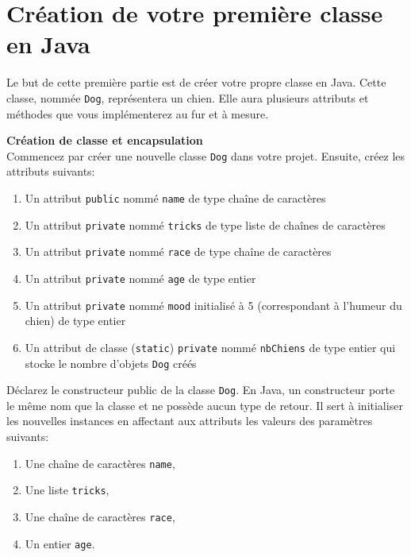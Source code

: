 \section{Création de votre première classe en Java}

Le but de cette première partie est de créer votre propre classe en Java. Cette classe, nommée \lstinline{Dog}, représentera un chien. Elle aura plusieurs attributs et méthodes que vous implémenterez au fur et à mesure.
\\

\begin{Exercice}[10 minutes] \textbf{Création de classe et encapsulation}\\
    Commencez par créer une nouvelle classe \lstinline{Dog} dans votre projet. Ensuite, créez les attributs suivants:
    \begin{enumerate}
    \item Un attribut \lstinline{public} nommé \lstinline{name} de type chaîne de caractères
    \item Un attribut \lstinline{private} nommé \lstinline{tricks} de type liste de chaînes de caractères
    \item Un attribut \lstinline{private} nommé \lstinline{race} de type chaîne de caractères
    \item Un attribut \lstinline{private} nommé \lstinline{age} de type entier
    \item Un attribut \lstinline{private} nommé \lstinline{mood} initialisé à 5 (correspondant à l'humeur du chien) de type entier
    \item Un attribut de classe (\lstinline{static}) \lstinline{private} nommé \lstinline{nbChiens} de type entier qui stocke le nombre d'objets \lstinline{Dog} créés
   	\end{enumerate}
   	
    Déclarez le constructeur public de la classe \lstinline{Dog}. En Java, un constructeur porte le même nom que la classe et ne possède aucun type de retour. Il sert à initialiser les nouvelles instances en affectant aux attributs les valeurs des paramètres suivants:

   	\begin{enumerate}
    \item Une chaîne de caractères \lstinline{name},
    \item Une liste \lstinline{tricks},
    \item Une chaîne de caractères \lstinline{race},
    \item Un entier \lstinline{age}.
   	\end{enumerate}
   	

\end{Exercice}
